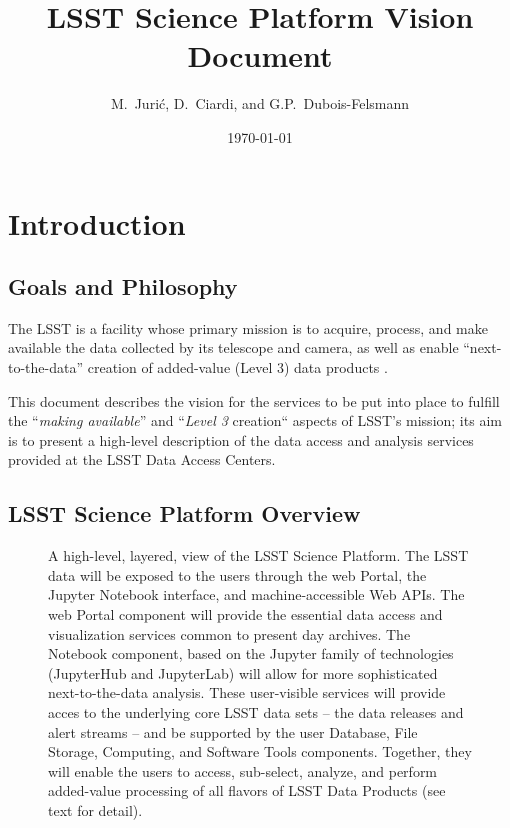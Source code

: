 \documentclass[DM,lsstdraft,toc]{lsstdoc}
\title[LSST Science Platform]{LSST Science Platform Vision Document}
\author{
M.~Juri\'c,
D.~Ciardi,
and
G.P.~Dubois-Felsmann
}
\date{\today}
\begin{document}
\maketitle

\section{Introduction}

\subsection{Goals and Philosophy}

The LSST is a facility whose primary mission is to acquire, process, and
make available the data collected by its telescope and camera, as well as
enable ``next-to-the-data'' creation of added-value (Level 3) data products
\cite{SRD}.

This document describes the vision for the services to be put into place to
fulfill the ``{\em making available}'' and ``{\em Level 3} creation``
aspects of LSST's mission; its aim is to present a high-level
description of the data access and analysis services provided at the
LSST Data Access Centers.

\subsection{LSST Science Platform Overview}

\begin{figure}
\centering
{}
\caption{
A high-level, layered, view of the LSST Science Platform.  The LSST data
will be exposed to the users through the web Portal, the Jupyter Notebook
interface, and machine-accessible Web APIs.  The web Portal component will
provide the essential data access and visualization services common to
present day archives.  The Notebook component, based on the Jupyter family
of technologies (JupyterHub and JupyterLab) will allow for more
sophisticated next-to-the-data analysis.  These user-visible services will
provide acces to the underlying core LSST data sets -- the data releases and
alert streams -- and be supported by the user Database, File Storage,
Computing, and Software Tools components.  Together, they will enable the
users to access, sub-select, analyze, and perform added-value processing of
all flavors of LSST Data Products (see text for detail). 
\label{fig:layeredLSP}}
\end{figure}
\end{document}
